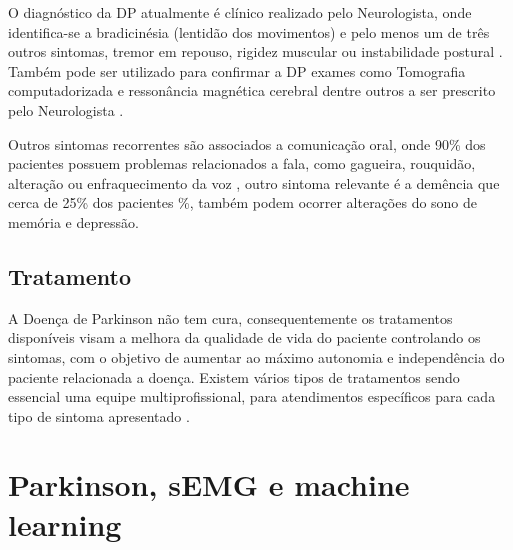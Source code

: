 O diagnóstico da DP atualmente é clínico realizado pelo Neurologista, onde identifica-se a bradicinésia (lentidão dos movimentos) e pelo menos um de três outros sintomas, tremor em repouso, rigidez muscular ou instabilidade postural \cite{gago2014manual}. Também pode ser utilizado para confirmar a DP exames como Tomografia computadorizada e ressonância magnética cerebral dentre outros a ser prescrito pelo Neurologista \cite{gago2014manual}.

Outros sintomas recorrentes são associados a comunicação oral, onde 90\% dos pacientes possuem problemas relacionados a fala, como gagueira, rouquidão, alteração ou enfraquecimento da voz \cite{zarzur2010laryngeal}, outro sintoma relevante é a demência que cerca de 25\% dos pacientes \cite{pamplona1996demencia}\%, também podem ocorrer alterações do sono de memória e depressão\cite{barbosa2005parkinsons}.

\subsection{Tratamento}
A Doença de Parkinson não tem cura, consequentemente os tratamentos disponíveis visam a melhora da qualidade de vida do paciente controlando os sintomas, com o objetivo de aumentar ao máximo autonomia e independência do paciente relacionada a doença. Existem vários tipos de tratamentos sendo essencial uma equipe multiprofissional, para atendimentos específicos para cada tipo de sintoma apresentado \cite{saito2011doencca}.

\section{Parkinson, sEMG e machine learning}

